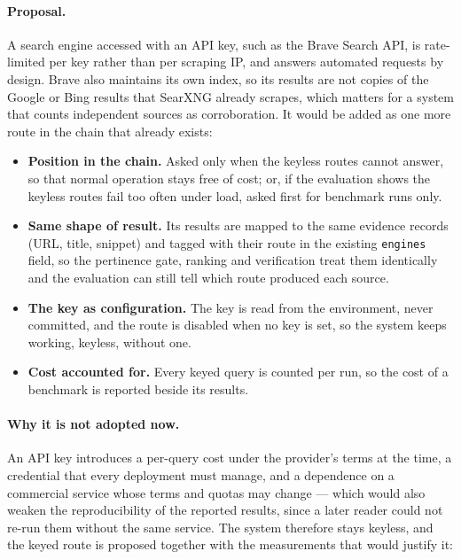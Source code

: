 \paragraph{Proposal.} A search engine accessed with an API key, such
as the Brave Search API, is rate-limited per key rather than per
scraping IP, and answers automated requests by design. Brave also
maintains its own index, so its results are not copies of the Google
or Bing results that SearXNG already scrapes, which matters for a
system that counts independent sources as corroboration. It would be
added as one more route in the chain that already exists:
\begin{itemize}
    \item \textbf{Position in the chain.} Asked only when the keyless
    routes cannot answer, so that normal operation stays free of cost;
    or, if the evaluation shows the keyless routes fail too often under
    load, asked first for benchmark runs only.
    \item \textbf{Same shape of result.} Its results are mapped to the
    same evidence records (URL, title, snippet) and tagged with their
    route in the existing \texttt{engines} field, so the pertinence
    gate, ranking and verification treat them identically and the
    evaluation can still tell which route produced each source.
    \item \textbf{The key as configuration.} The key is read from the
    environment, never committed, and the route is disabled when no key
    is set, so the system keeps working, keyless, without one.
    \item \textbf{Cost accounted for.} Every keyed query is counted per
    run, so the cost of a benchmark is reported beside its results.
\end{itemize}

\paragraph{Why it is not adopted now.} An API key introduces a
per-query cost under the provider's terms at the time, a credential
that every deployment must manage, and a dependence on a commercial
service whose terms and quotas may change --- which would also weaken
the reproducibility of the reported results, since a later reader
could not re-run them without the same service. The system therefore
stays keyless, and the keyed route is proposed together with the
measurements that would justify it:

